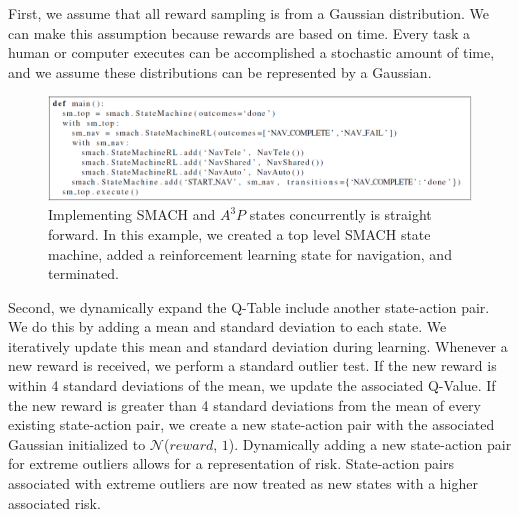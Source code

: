 \documentclass[letterpaper, 10 pt, conference]{ieeeconf}  %
\begin{document}
First, we assume that all reward sampling is from a Gaussian distribution. We can make this assumption because rewards are based on time. Every task a human or computer executes can be accomplished a stochastic amount of time, and we assume these distributions can be represented by a Gaussian. 

\begin{figure}
\vspace*{0.1in}
\centering
\includegraphics[width=1.8\columnwidth]{code_snippet}
%
%
\caption{Implementing SMACH and $A^3P$ states concurrently is straight forward. In this example, we created a top level SMACH state machine, added a reinforcement learning state for navigation, and terminated.}
\label{CodeSnippet}
\end{figure}


Second, we dynamically expand the Q-Table include another state-action pair. We do this by adding a mean and standard deviation to each state. We iteratively update this mean and standard deviation during learning. Whenever a new reward is received, we perform a standard outlier test. If the new reward is within 4 standard deviations of the mean, we update the associated Q-Value. If the new reward is greater than 4 standard deviations from the mean of every existing state-action pair, we create a new state-action pair with the  associated Gaussian initialized to $\mathcal{N}$($reward$, $1$). Dynamically adding a new state-action pair for extreme outliers allows for a representation of risk. State-action pairs associated with extreme outliers are now treated as new states with a higher associated risk.
\end{document}
